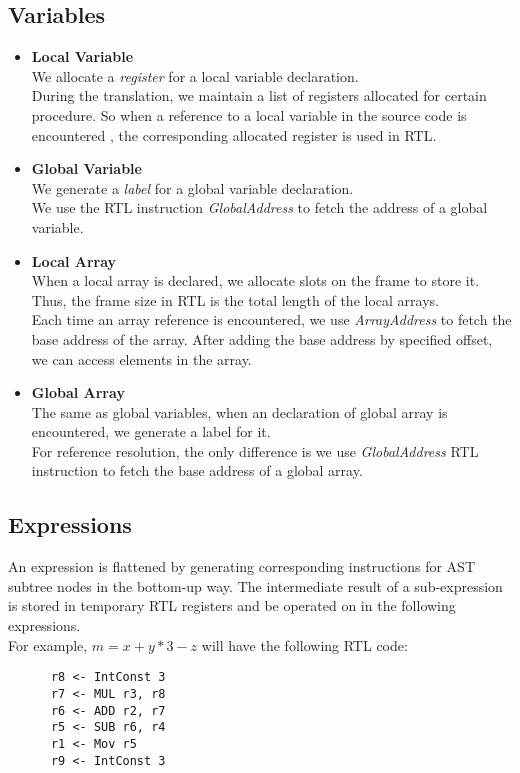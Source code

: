 \documentclass[a4paper,11pt]{article}
\begin{document}
\subsection{Variables}
\begin{itemize}
	\item \textbf{Local Variable} \\
	We allocate a \textit{register} for a local variable declaration. \\
	During the translation, we maintain a list of registers allocated for certain procedure. So when a reference to a local variable in the source code is encountered , the corresponding allocated register is used in RTL.
	
	\item \textbf{Global Variable} \\
	We generate a \textit{label} for a global variable declaration. \\
	We use the RTL instruction \textit{GlobalAddress} to fetch the address of a global variable.
	
	\item \textbf{Local Array} \\
	When a local array is declared, we allocate slots on the frame to store it. Thus, the frame size in RTL is the total length of the local arrays.\\
	Each time an array reference is encountered, we use \textit{ArrayAddress} to fetch the base address of the array. After adding the base address by specified offset, we can access elements in the array.
	
	\item \textbf{Global Array} \\
	The same as global variables, when an declaration of global array is encountered, we generate a label for it.\\
	For reference resolution, the only difference is we use \textit{GlobalAddress} RTL instruction to fetch the base address of a global array. 
	\end{itemize}
	
\subsection{Expressions}
	An expression is flattened by generating corresponding instructions for AST subtree nodes in the bottom-up way. The intermediate result of a sub-expression is stored in temporary RTL registers and be operated on in the following expressions.\\
	For example, $m=x+y*3-z$ will have the following RTL code:
	\begin{lstlisting}
      r8 <- IntConst 3
      r7 <- MUL r3, r8
      r6 <- ADD r2, r7
      r5 <- SUB r6, r4
      r1 <- Mov r5
      r9 <- IntConst 3
	\end{lstlisting}
	
\end{document}
